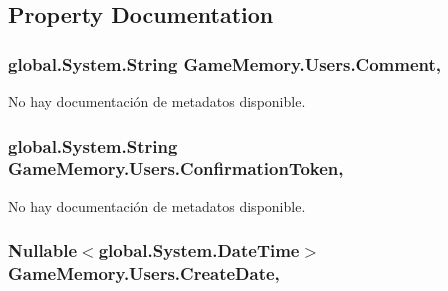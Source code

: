 \subsection{Property Documentation}
\hypertarget{class_game_memory_1_1_users_a78fc5aef90521ab4a0d0ffa82eb5a27a}{
\subsubsection[{Comment}]{\setlength{\rightskip}{0pt plus 5cm}global.\-System.\-String Game\-Memory.\-Users.\-Comment\hspace{0.3cm}{\ttfamily [get]}, {\ttfamily [set]}}}\label{class_game_memory_1_1_users_a78fc5aef90521ab4a0d0ffa82eb5a27a}


No hay documentación de metadatos disponible. 

\hypertarget{class_game_memory_1_1_users_aae1d5f9c95e32efb79d2d1a5ec2e76f9}{
\subsubsection[{Confirmation\-Token}]{\setlength{\rightskip}{0pt plus 5cm}global.\-System.\-String Game\-Memory.\-Users.\-Confirmation\-Token\hspace{0.3cm}{\ttfamily [get]}, {\ttfamily [set]}}}\label{class_game_memory_1_1_users_aae1d5f9c95e32efb79d2d1a5ec2e76f9}


No hay documentación de metadatos disponible. 

\hypertarget{class_game_memory_1_1_users_ad285931a74d022fafbd9299b88e2125a}{
\subsubsection[{Create\-Date}]{\setlength{\rightskip}{0pt plus 5cm}Nullable$<$global.\-System.\-Date\-Time$>$ Game\-Memory.\-Users.\-Create\-Date\hspace{0.3cm}{\ttfamily [get]}, {\ttfamily [set]}}}\label{class_game_memory_1_1_users_ad285931a74d022fafbd9299b88e2125a}


